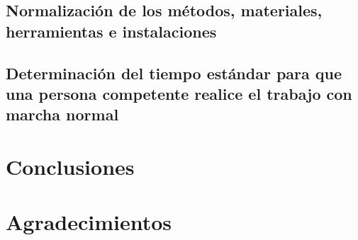     \subsection{Normalización de los métodos, materiales, herramientas e instalaciones}
    
    \subsection{Determinación del tiempo estándar para que una persona competente realice el trabajo con marcha normal}
    
    
    
    
    
    
    
    \section{Conclusiones}
    
    
    
    \section{Agradecimientos}
    
    
    
    
    
    
    
    \appendix
    \label{Figura:instructivo}
    
    \label{Figura:Materiales}
    
    \label{Figura: DigBim}
    
    
    \newpage
    
    
